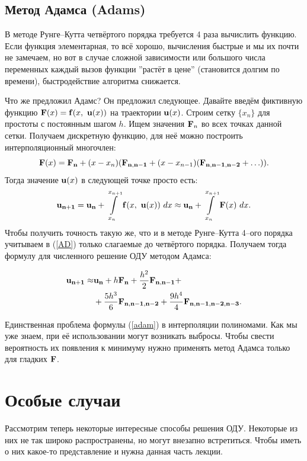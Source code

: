 \documentclass[a4paper,9pt,russian]{article}
\begin{document}
\subsection{Метод Адамса (Adams)}
    В методе Рунге--Кутта четвёртого порядка требуется 4 раза вычислить функцию. Если функция элементарная, то всё хорошо, вычисления быстрые и мы их почти не замечаем, но вот в случае сложной зависимости или большого числа переменных каждый вызов функции ''растёт в цене'' (становится долгим по времени), быстродействие алгоритма снижается.\par
    Что же предложил Адамс? Он предложил следующее. Давайте введём фиктивную функцию ${\bf F}(x) = {\bf f}(x,\ {\bf u}(x))$ на траектории ${\bf u}(x)$. Строим сетку $\{x_n \}$ для простоты с постоянным шагом $h$. Ищем значения ${\bf F}_n$ во всех точках данной сетки. Получаем дискретную функцию, для неё можно построить интерполяционный многочлен:
    \begin{equation}\label{AD}
        {\bf F}(x) = {\bf F_n}+(x-x_n)({\bf F_{n,n-1}}+(x-x_{n-1})({\bf F_{n,n-1,n-2}}+\ldots)).
    \end{equation}
    Тогда значение ${\bf u}(x)$ в следующей точке просто есть:
    \begin{equation}
        {\bf u_{n+1}} = {\bf u_{n}} + \int\limits_{x_n}^{x_{n+1}} {\bf f}(x,\ {\bf u}(x))\ dx \approx {\bf u_{n}} + \int\limits_{x_n}^{x_{n+1}} {\bf F}(x)\ dx. 
    \end{equation}
    Чтобы получить точность такую же, что и в методе Рунге--Кутта 4--ого порядка учитываем в (\ref{AD}) только слагаемые до четвёртого порядка. Получаем тогда формулу для численного решение ОДУ {методом Адамса}:
    
     \begin{equation}\label{adam}
     \begin{split}
        {\bf u_{n+1}} \approx & {\bf u_{n}} + h{\bf F_n}+\frac{h^2}{2}{\bf F_{n,n-1}} +\\
        &+\frac{5h^3}{6}{\bf F_{n,n-1,n-2}} + \frac{9h^4}{4}{\bf F_{n,n-1,n-2,n-3}}.
     \end{split}
     \end{equation}
    
    Единственная проблема формулы (\ref{adam}) в интерполяции полиномами. Как мы уже знаем, при её использовании могут возникать выбросы. Чтобы свести вероятность их появления к минимуму нужно применять метод Адамса только для гладких ${\bf F}$.
\section{Особые случаи}
    Рассмотрим теперь некоторые интересные способы решения ОДУ. Некоторые из них не так широко распространены, но могут внезапно встретиться. Чтобы иметь о них какое-то представление и нужна данная часть лекции.
\end{document}

